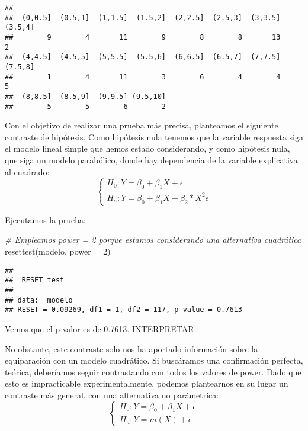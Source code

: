 \documentclass[
]{article}
\newenvironment{Shaded}{\begin{snugshade}}{\end{snugshade}}
\newcommand{\AttributeTok}[1]{\textcolor[rgb]{0.77,0.63,0.00}{#1}}
\newcommand{\CommentTok}[1]{\textcolor[rgb]{0.56,0.35,0.01}{\textit{#1}}}
\newcommand{\DecValTok}[1]{\textcolor[rgb]{0.00,0.00,0.81}{#1}}
\newcommand{\FunctionTok}[1]{\textcolor[rgb]{0.00,0.00,0.00}{#1}}
\newcommand{\NormalTok}[1]{#1}
\begin{document}
\begin{verbatim}
## 
##  (0,0.5]  (0.5,1]  (1,1.5]  (1.5,2]  (2,2.5]  (2.5,3]  (3,3.5]  (3.5,4] 
##        9        4       11        9        8        8       13        2 
##  (4,4.5]  (4.5,5]  (5,5.5]  (5.5,6]  (6,6.5]  (6.5,7]  (7,7.5]  (7.5,8] 
##        1        4       11        3        6        4        4        5 
##  (8,8.5]  (8.5,9]  (9,9.5] (9.5,10] 
##        5        5        6        2
\end{verbatim}

Con el objetivo de realizar una prueba más precisa, planteamos el
siguiente contraste de hipótesis. Como hipótesis nula tenemos que la
variable respuesta siga el modelo lineal simple que hemos estado
considerando, y como hipótesis nula, que siga un modelo parabólico,
donde hay dependencia de la variable explicativa al cuadrado: \[
\begin{cases}
H_0: Y=\beta_0+\beta_1X+\epsilon\\
H_a: Y=\beta_0+\beta_1X+\beta_2*X^2\epsilon
\end{cases}
\]

Ejecutamos la prueba:

\begin{Shaded}
\begin{Highlighting}[]
\CommentTok{\# Empleamos power = 2 porque estamos considerando una alternativa cuadrática}
\FunctionTok{resettest}\NormalTok{(modelo, }\AttributeTok{power =} \DecValTok{2}\NormalTok{)}
\end{Highlighting}
\end{Shaded}

\begin{verbatim}
## 
##  RESET test
## 
## data:  modelo
## RESET = 0.09269, df1 = 1, df2 = 117, p-value = 0.7613
\end{verbatim}

Vemos que el p-valor es de 0.7613. INTERPRETAR.

No obstante, este contraste solo nos ha aportado información sobre la
equiparación con un modelo cuadrático. Si buscáramos una confirmación
perfecta, teórica, deberíamos seguir contrastando con todos los valores
de power. Dado que esto es impracticable experimentalmente, podemos
plantearnos en su lugar un contraste más general, con una alternativa no
parámetrica: \[
\begin{cases}
H_0: Y=\beta_0+\beta_1X+\epsilon\\
H_a: Y=m(X)+\epsilon
\end{cases}
\]
\end{document}
